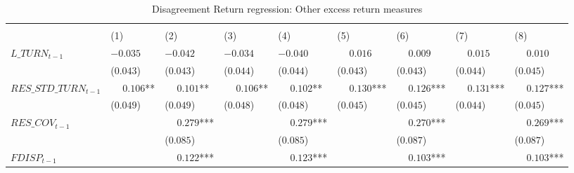 
\begin{landscape}\begin{table}

\caption[Disagreement Return Regression: Excess Returns]{\label{tab:disagreement_return_reg_2}Disagreement Return regression: Other excess return measures}
\centering
\fontsize{9}{11}\selectfont
\begin{threeparttable}
\begin{tabular}[t]{>{\raggedright\arraybackslash}p{3.9cm}>{\raggedright\arraybackslash}p{1.7cm}>{\raggedright\arraybackslash}p{1.7cm}>{\raggedright\arraybackslash}p{1.7cm}>{\raggedright\arraybackslash}p{1.7cm}>{\raggedright\arraybackslash}p{1.7cm}>{\raggedright\arraybackslash}p{1.7cm}>{\raggedright\arraybackslash}p{1.7cm}>{\raggedright\arraybackslash}p{1.7cm}}
\toprule
\multicolumn{1}{c}{ } & \multicolumn{4}{c}{$CAPM\_ALPHA_t$} & \multicolumn{4}{c}{$FF3\_ALPHA_t$} \\
\cmidrule(l{3pt}r{3pt}){2-5} \cmidrule(l{3pt}r{3pt}){6-9}
 & \phantom{-}(1) & \phantom{-}(2) & \phantom{-}(3) & \phantom{-}(4) & \phantom{-}(5) & \phantom{-}(6) & \phantom{-}(7) & \phantom{-}(8)\\
\midrule
$L\_TURN_{t-1}$ & $-0.035$ & $-0.042$ & $-0.034$ & $-0.040$ & $\phantom{-}0.016$ & $\phantom{-}0.009$ & $\phantom{-}0.015$ & $\phantom{-}0.010$\\
 & (\phantom{-}$0.043$) & (\phantom{-}$0.043$) & (\phantom{-}$0.044$) & (\phantom{-}$0.044$) & (\phantom{-}$0.043$) & (\phantom{-}$0.043$) & (\phantom{-}$0.044$) & (\phantom{-}$0.045$)\\
\addlinespace
$RES\_STD\_TURN_{t-1}$ & $\phantom{-}0.106$** & $\phantom{-}0.101$** & $\phantom{-}0.106$** & $\phantom{-}0.102$** & $\phantom{-}0.130$*** & $\phantom{-}0.126$*** & $\phantom{-}0.131$*** & $\phantom{-}0.127$***\\
 & (\phantom{-}$0.049$) & (\phantom{-}$0.049$) & (\phantom{-}$0.048$) & (\phantom{-}$0.048$) & (\phantom{-}$0.045$) & (\phantom{-}$0.045$) & (\phantom{-}$0.044$) & (\phantom{-}$0.045$)\\
\addlinespace
$RES\_COV_{t-1}$ &  & $\phantom{-}0.279$*** &  & $\phantom{-}0.279$*** &  & $\phantom{-}0.270$*** &  & $\phantom{-}0.269$***\\
 &  & (\phantom{-}$0.085$) &  & (\phantom{-}$0.085$) &  & (\phantom{-}$0.087$) &  & (\phantom{-}$0.087$)\\
\addlinespace
$FDISP_{t-1}$ &  & $\phantom{-}0.122$*** &  & $\phantom{-}0.123$*** &  & $\phantom{-}0.103$*** &  & $\phantom{-}0.103$***\\

\end{tabular}
\end{threeparttable}
\end{table}
\end{landscape}
